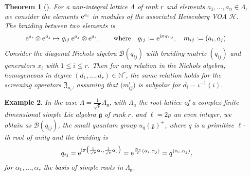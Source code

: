 \documentclass[pdftex]{sigma}%
\numberwithin{equation}{section}
\newtheorem{teo}{Theorem}[section]
\newtheorem{ese}[teo]{Example}
\newcommand{\N}{\mathbb{N}}
\begin{document}
\begin{teo}[{\cite[Theorem 7.1]{Len17}}]\label{NArelations}
For a non-integral lattice $\Lambda$ of rank $r$ and elements $a_1, \dots, \allowbreak a_n \in \Lambda$, we consider the elements ${\rm e}^{a_i}$ in modules of the associated Heisenberg VOA $\mathcal{H}$. The braiding between two elements is
\[{\rm e}^{a_i} \otimes {\rm e}^{a_j} \mapsto q_{ij} \; {\rm e}^{a_j} \otimes {\rm e}^{a_i},\qquad
 \text{where} \quad q_{ij} := {\rm e}^{{\rm i} \pi m_{ij}}, \quad m_{ij}:=(a_i, a_j).\]
Consider the diagonal Nichols algebra $\mathcal{B}(q_{ij})$ with braiding matrix $(q_{ij})$ and generators $x_{i}$ with $1\leq i\leq r$. Then for any relation in the Nichols algebra, homogeneous in degree $(d_1, \dots, d_r) \in \N^r$, the same relation holds for the screening operators $\mathfrak{Z}_{a_i}$, assuming that $\big(m^\iota_{ij}\big)$ is subpolar for $d_i=\iota^{-1}(i)$.
\end{teo}

\begin{ese} In the case $\Lambda= \frac{1}{\sqrt{p}} \Lambda_\mathfrak{g}$, with $\Lambda_\mathfrak{g}$ the root-lattice of a complex finite-dimensional simple Lie algebra $\mathfrak{g}$ of rank $r$, and $\ell=2p$ an even integer, we obtain as $\mathcal{B}(q_{ij})$, the small quantum group $u_q(\mathfrak{g})^+$, where $q$ is a primitive $\ell$-th root of unity and the braiding is
\[ q_{ij} = {\rm e}^{{\rm i} \pi \big(\frac{1}{\sqrt{p}}\alpha_i, \frac{1}{\sqrt{p}}\alpha_j\big)} = {\rm e}^{\frac{2{\rm i} \pi}{\ell}(\alpha_i,\alpha_j)} = q^{(\alpha_i,\alpha_j)},\]
for $\alpha_1,\dots,\alpha_r$ the basis of simple roots in $\Lambda_\mathfrak{g}$.
\end{ese}
\end{document}
